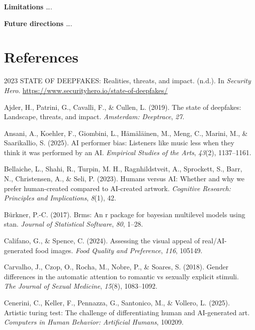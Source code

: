 \documentclass[
  jou,
  floatsintext,
  longtable,
  nolmodern,
  notxfonts,
  notimes,
  colorlinks=true,linkcolor=blue,citecolor=blue,urlcolor=blue]{apa7}
\newlength{\cslhangindent}
\newenvironment{CSLReferences}[2] %
 {\begin{list}{}{%
  \setlength{\itemindent}{0pt}
  \setlength{\leftmargin}{0pt}
  \setlength{\parsep}{0pt}
  \ifodd #1
   \setlength{\leftmargin}{\cslhangindent}
   \setlength{\itemindent}{-1\cslhangindent}
  \fi
  \setlength{\itemsep}{#2\baselineskip}}}
 {\end{list}}
\begin{document}
\textbf{Limitations} \ldots.

\textbf{Future directions} \ldots.

\section{References}\label{references}

\label{refs}
\begin{CSLReferences}{1}{0}
2023 STATE OF DEEPFAKES: Realities, threats, and impact. (n.d.). In
\emph{Security Hero}.
\url{https://www.securityhero.io/state-of-deepfakes/}

Ajder, H., Patrini, G., Cavalli, F., \& Cullen, L. (2019). The state of
deepfakes: Landscape, threats, and impact. \emph{Amsterdam: Deeptrace},
\emph{27}.

Ansani, A., Koehler, F., Giombini, L., Hämäläinen, M., Meng, C., Marini,
M., \& Saarikallio, S. (2025). AI performer bias: Listeners like music
less when they think it was performed by an AI. \emph{Empirical Studies
of the Arts}, \emph{43}(2), 1137--1161.

Bellaiche, L., Shahi, R., Turpin, M. H., Ragnhildstveit, A., Sprockett,
S., Barr, N., Christensen, A., \& Seli, P. (2023). Humans versus AI:
Whether and why we prefer human-created compared to AI-created artwork.
\emph{Cognitive Research: Principles and Implications}, \emph{8}(1), 42.

Bürkner, P.-C. (2017). Brms: An r package for bayesian multilevel models
using stan. \emph{Journal of Statistical Software}, \emph{80}, 1--28.

Califano, G., \& Spence, C. (2024). Assessing the visual appeal of
real/AI-generated food images. \emph{Food Quality and Preference},
\emph{116}, 105149.

Carvalho, J., Czop, O., Rocha, M., Nobre, P., \& Soares, S. (2018).
Gender differences in the automatic attention to romantic vs sexually
explicit stimuli. \emph{The Journal of Sexual Medicine}, \emph{15}(8),
1083--1092.

Cenerini, C., Keller, F., Pennazza, G., Santonico, M., \& Vollero, L.
(2025). Artistic turing test: The challenge of differentiating human and
AI-generated art. \emph{Computers in Human Behavior: Artificial Humans},
100209.


\end{CSLReferences}
\end{document}

